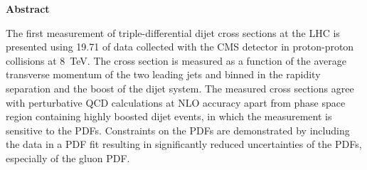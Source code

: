 \thispagestyle{plain}
\begin{center}
    \LARGE{\textbf{Abstract}}\\[2em]
\end{center}
    \normalsize
    The first measurement of triple-differential dijet cross sections at the LHC is presented
    using \SI{19.71}{\fbinv} of data collected with the CMS detector in
    proton-proton collisions at \SI{8}{\TeV}. The cross section is measured as a
    function of the average transverse momentum of the two leading jets and
    binned in the rapidity separation and the boost of the dijet system. The
    measured cross sections agree with perturbative QCD calculations at NLO
    accuracy apart from phase space region containing highly boosted dijet
    events, in which the measurement is sensitive to the PDFs. Constraints
    on the PDFs are demonstrated by including the data in a PDF fit resulting in
    significantly reduced uncertainties of the PDFs, especially of the gluon PDF.
    \vspace{1ex}


\cleardoublepage

